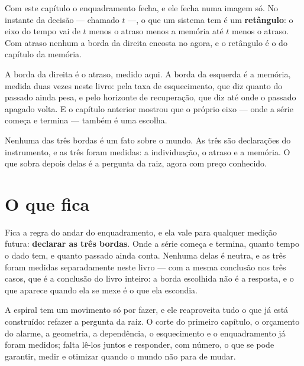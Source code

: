 Com este capítulo o enquadramento fecha, e ele fecha numa imagem só. No instante da decisão --- chamado $t$ ---, o que
um sistema tem é um \textbf{retângulo}: o eixo do tempo vai de $t$ menos o atraso menos a memória até
$t$ menos o atraso. Com atraso nenhum a borda da direita encosta no agora, e o retângulo é o do
capítulo da memória.

A borda da direita é o atraso, medido aqui. A borda da esquerda é a memória, medida duas vezes neste
livro: pela taxa de esquecimento, que diz quanto do passado ainda pesa, e pelo horizonte de
recuperação, que diz até onde o passado apagado volta. E o capítulo anterior mostrou que o próprio
eixo --- onde a série começa e termina --- também é uma escolha.

Nenhuma das três bordas é um fato sobre o mundo. As três são declarações do instrumento, e as três
foram medidas: a individuação, o atraso e a memória. O que sobra depois delas é a pergunta da raiz,
agora com preço conhecido.

\section{O que fica}

Fica a regra do andar do enquadramento, e ela vale para qualquer medição futura: \textbf{declarar as três
bordas}. Onde a série começa e termina, quanto tempo o dado tem, e quanto passado ainda conta.
Nenhuma delas é neutra, e as três foram medidas separadamente neste livro --- com a mesma conclusão
nos três casos, que é a conclusão do livro inteiro: a borda escolhida não é a resposta, e o que
aparece quando ela se mexe é o que ela escondia.

A espiral tem um movimento só por fazer, e ele reaproveita tudo o que já está construído: refazer a pergunta da
raiz. O corte do primeiro capítulo, o orçamento do alarme, a
geometria, a dependência, o esquecimento e o enquadramento já foram medidos; falta lê-los juntos e
responder, com número, o que se pode garantir, medir e otimizar quando o mundo não para de mudar.
